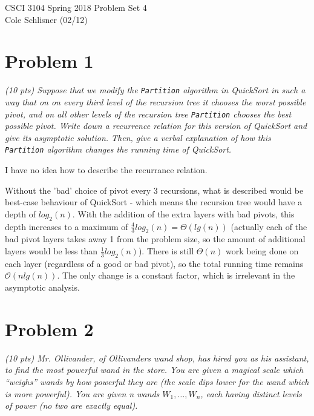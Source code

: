 \documentclass[11pt]{article} \setlength{\oddsidemargin}{0in}
\begin{document}
\noindent CSCI 3104 Spring 2018 \hfill Problem Set 4\\
Cole Schlisner (02/12)

\hrulefill

{\selectfont

  \section*{Problem 1}

  \textit{(10 pts) Suppose that we modify the \texttt{Partition}
    algorithm in QuickSort in such a way that on on every third level
    of the recursion tree it chooses the worst possible pivot, and on
    all other levels of the recursion tree \texttt{Partition} chooses
    the best possible pivot.  Write down a recurrence relation for
    this version of QuickSort and give its asymptotic solution. Then,
    give a verbal explanation of how this \texttt{Partition} algorithm
    changes the running time of QuickSort.}

    I have no idea how to describe the recurrance relation. 


    Without the 'bad' choice of pivot every 3 recursions, what is described would be best-case behaviour of QuickSort - which means the recursion tree would have a depth of $log_2(n)$. With the addition of the extra layers with bad pivots, this depth increases to a maximum of $\frac{4}{3}log_2(n) = \Theta(lg(n))$ (actually each of the bad pivot layers takes away 1 from the problem size, so the amount of additional layers would be less than $\frac{1}{3}log_2(n)$). There is still $\Theta(n)$ work being done on each layer (regardless of a good or bad pivot), so the total running time remains $\mathcal{O}(n\textit{lg}(n))$. The only change is a constant factor, which is irrelevant in the asymptotic analysis. 

  \newpage

  \section*{Problem 2}

  \textit{(10 pts) Mr. Ollivander, of Ollivanders wand shop, has hired
    you as his assistant, to find the most powerful wand in the
    store. You are given a magical scale which ``weighs'' wands by how
    powerful they are (the scale dips lower for the wand which is more
    powerful). You are given n wands $W_1, \dots ,W_n$, each having
    distinct levels of power (no two are exactly equal).}

}
\end{document}
